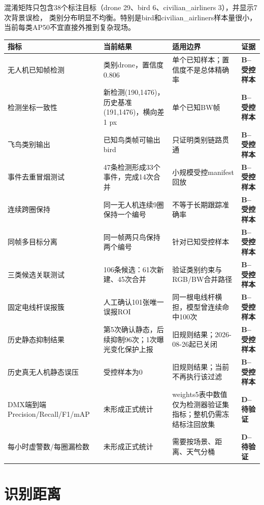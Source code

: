 \documentclass[UTF8,a4paper,11pt,openany]{ctexrep}
\newcommand{\metricB}{\textcolor{dmxblue}{\textbf{B--受控样本}}}
\newcommand{\metricD}{\textcolor{dmxred}{\textbf{D--待验证}}}
\begin{document}
混淆矩阵只包含38个标注目标（drone 29、bird 6、civilian\_airliners 3），并显示7次背景误检，
类别分布明显不均衡。特别是bird和civilian\_airliners样本量很小，当前每类AP50不宜直接外推到复杂现场。

\begin{table}[H]
  \centering
  \small
  \begin{tabularx}{\textwidth}{p{4.1cm}p{4.0cm}X p{2.6cm}}
    \toprule
    指标 & 当前结果 & 适用边界 & 证据 \\
    \midrule
    无人机已知帧检测 & 类别drone，置信度0.806 & 单个已知样本；置信度不是总体精确率 & \metricB \\
    检测坐标一致性 & 新检测(190,1476)，历史基准(191,1476)，横向差1 px & 单个已知BW帧 & \metricB \\
    飞鸟类别输出 & 已知鸟类帧可输出bird & 只证明类别链路贯通 & \metricB \\
    事件去重冒烟测试 & 47条检测形成33个事件，完成14次合并 & 小规模受控manifest回放 & \metricB \\
    连续跨圈保持 & 同一无人机连续9圈保持一个编号 & 不等于长期跟踪准确率 & \metricB \\
    同帧多目标分离 & 同一帧两只鸟保持两个编号 & 针对已知受控样本 & \metricB \\
    三类候选关联测试 & 106条候选：61次新建、45次合并 & 验证类别约束与RGB/BW合并路径 & \metricB \\
    固定电线杆误报簇 & 人工确认101张唯一误报ROI & 同一根电线杆横担，模型曾连续命中100次 & \metricB \\
    历史静态抑制结果 & 第5次确认静态，后续抑制96次；1次曝光变化保护上报 & 旧规则结果；2026-08-26起已关闭 & \metricB \\
    历史真无人机静态误压 & 受控样本为0 & 旧规则结果；当前不再执行该过滤 & \metricB \\
    DMX端到端Precision/Recall/F1/mAP & 未形成正式统计 & weights5表中数值仅为检测器验证集指标；整机仍需冻结标注回放集 & \metricD \\
    每小时虚警数/每圈漏检数 & 未形成正式统计 & 需要按场景、距离、天气分桶 & \metricD \\
    \bottomrule
  \end{tabularx}
\end{table}

\section{识别距离}
\end{document}
